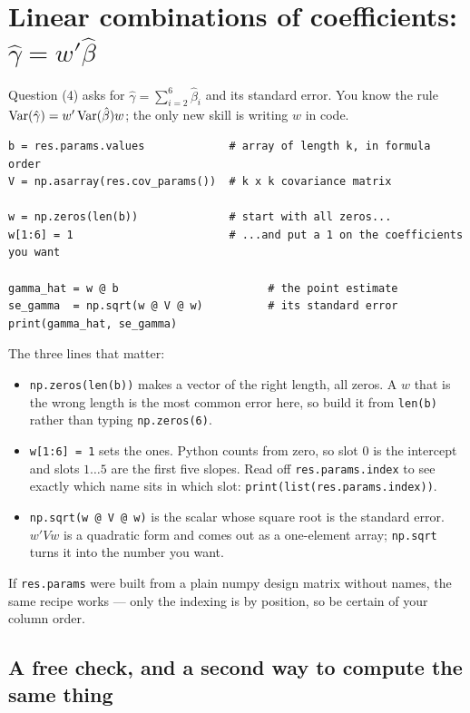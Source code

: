 \documentclass[11pt]{article}
\newcommand{\code}[1]{\texttt{#1}}
\begin{document}
\section{\texorpdfstring{Linear combinations of coefficients: $\hat\gamma = w'\hat\beta$}{Linear combinations of coefficients}}

Question (4) asks for $\hat\gamma = \sum_{i=2}^{6}\hat\beta_i$ and its standard
error. You know the rule $\operatorname{Var}(\hat\gamma) = w'\operatorname{Var}(\hat\beta)w$; the only new
skill is writing $w$ in code.

\begin{lstlisting}
b = res.params.values             # array of length k, in formula order
V = np.asarray(res.cov_params())  # k x k covariance matrix

w = np.zeros(len(b))              # start with all zeros...
w[1:6] = 1                        # ...and put a 1 on the coefficients you want

gamma_hat = w @ b                       # the point estimate
se_gamma  = np.sqrt(w @ V @ w)          # its standard error
print(gamma_hat, se_gamma)
\end{lstlisting}

\noindent The three lines that matter:

\begin{itemize}[leftmargin=1.4em,itemsep=2pt]
  \item \code{np.zeros(len(b))} makes a vector of the right length, all zeros. A
        $w$ that is the wrong length is the most common error here, so build it
        from \code{len(b)} rather than typing \code{np.zeros(6)}.
  \item \code{w[1:6] = 1} sets the ones. Python counts from zero, so slot $0$ is
        the intercept and slots $1\ldots5$ are the first five slopes. Read off
        \code{res.params.index} to see exactly which name sits in which slot:
        \code{print(list(res.params.index))}.
  \item \code{np.sqrt(w @ V @ w)} is the scalar whose square root is the standard
        error. $w'Vw$ is a quadratic form and comes out as a one-element array;
        \code{np.sqrt} turns it into the number you want.
\end{itemize}

\noindent If \code{res.params} were built from a plain numpy design matrix
without names, the same recipe works --- only the indexing is by position, so
be certain of your column order.

\subsection{A free check, and a second way to compute the same thing}
\end{document}
